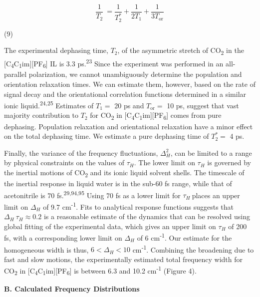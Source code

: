 \documentclass[]{article}
\begin{document}
\[\frac{1}{T_{2}}\  = \frac{1}{T_{2}^{*}} + \frac{1}{2T_{1}} + \frac{1}{3T_{\text{or}}}\]

(9)

The experimental dephasing time, \(T_{2}\), of the asymmetric stretch of
CO\textsubscript{2} in the
{[}C\textsubscript{4}C\textsubscript{1}im{]}{[}PF\textsubscript{6}{]} IL
is 3.3 ps.\textsuperscript{23} Since the experiment was performed in an
all-parallel polarization, we cannot unambiguously determine the
population and orientation relaxation times. We can estimate them,
however, based on the rate of signal decay and the orientational
correlation functions determined in a similar ionic
liquid.\textsuperscript{24,25} Estimates of \(T_{1} =\) 20 ps and
\(T_{\mathrm{\text{or}}} =\) 10 ps, suggest that vast majority
contribution to \(T_{2}\) for CO\textsubscript{2} in
{[}C\textsubscript{4}C\textsubscript{1}im{]}{[}PF\textsubscript{6}{]}
comes from pure dephasing. Population relaxation and orientational
relaxation have a minor effect on the total dephasing time. We estimate
a pure dephasing time of \(T_{2}^{*} =\) 4 ps.

Finally, the variance of the frequency fluctuations, \(\Delta_{H}^{2}\),
can be limited to a range by physical constraints on the values of
\(\tau_{H}\). The lower limit on \(\tau_{H}\) is governed by the
inertial motions of CO\textsubscript{2} and its ionic liquid solvent
shells. The timescale of the inertial response in liquid water is in the
sub-60 fs range, while that of acetonitrile is 70
fs.\textsuperscript{29,94,95} Using 70 fs as a lower limit for
\(\tau_{H}\ \)places an upper limit on \(\Delta_{H}\) of 9.7
cm\textsuperscript{-1}. Fits to analytical response functions suggests
that \(\Delta_{H}\ \tau_{H} \approx 0.2\) is a reasonable estimate of
the dynamics that can be resolved using global fitting of the
experimental data, which gives an upper limit on \(\tau_{H}\) of 200 fs,
with a corresponding lower limit on \(\Delta_{H}\) of 6
cm\textsuperscript{-1}. Our estimate for the homogeneous width is thus,
\(6 < \Delta_{H} < 10\) cm\textsuperscript{‑1}. Combining the broadening
due to fast and slow motions, the experimentally estimated total
frequency width for CO\textsubscript{2} in
{[}C\textsubscript{4}C\textsubscript{1}im{]}{[}PF\textsubscript{6}{]} is
between 6.3 and 10.2 cm\textsuperscript{-1} (Figure 4).

\textbf{B. Calculated Frequency Distributions}
\end{document}
